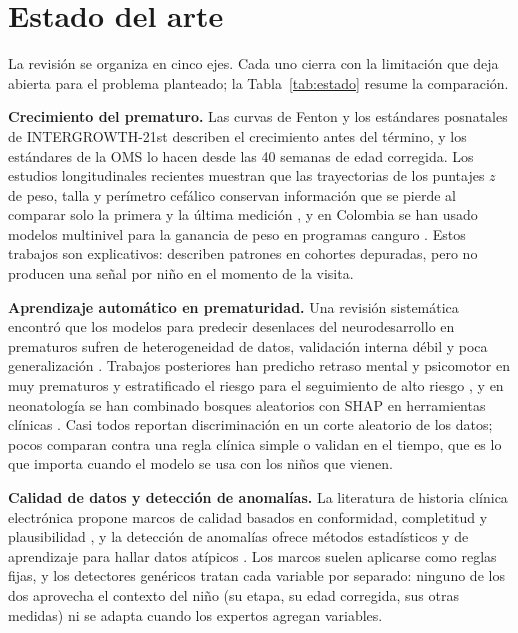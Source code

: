 \section{Estado del arte}
\label{sec:estado}

La revisión se organiza en cinco ejes. Cada uno cierra con la limitación que deja abierta para el problema planteado; la Tabla~\ref{tab:estado} resume la comparación.

\textbf{Crecimiento del prematuro.} Las curvas de Fenton \cite{fenton2013} y los estándares posnatales de INTERGROWTH-21st \cite{villar2015} describen el crecimiento antes del término, y los estándares de la OMS \cite{oms2006} lo hacen desde las 40 semanas de edad corregida. Los estudios longitudinales recientes muestran que las trayectorias de los puntajes $z$ de peso, talla y perímetro cefálico conservan información que se pierde al comparar solo la primera y la última medición \cite{ren2024,nel2026}, y en Colombia se han usado modelos multinivel para la ganancia de peso en programas canguro \cite{melo2016}. Estos trabajos son explicativos: describen patrones en cohortes depuradas, pero no producen una señal por niño en el momento de la visita.

\textbf{Aprendizaje automático en prematuridad.} Una revisión sistemática encontró que los modelos para predecir desenlaces del neurodesarrollo en prematuros sufren de heterogeneidad de datos, validación interna débil y poca generalización \cite{baker2023}. Trabajos posteriores han predicho retraso mental y psicomotor en muy prematuros \cite{demirci2024} y estratificado el riesgo para el seguimiento de alto riesgo \cite{mlrisk2024}, y en neonatología se han combinado bosques aleatorios con SHAP en herramientas clínicas \cite{wang2024}. Casi todos reportan discriminación en un corte aleatorio de los datos; pocos comparan contra una regla clínica simple o validan en el tiempo, que es lo que importa cuando el modelo se usa con los niños que vienen.

\textbf{Calidad de datos y detección de anomalías.} La literatura de historia clínica electrónica propone marcos de calidad basados en conformidad, completitud y plausibilidad \cite{kahn2016,weiskopf2013}, y la detección de anomalías ofrece métodos estadísticos y de aprendizaje para hallar datos atípicos \cite{chandola2009}. Los marcos suelen aplicarse como reglas fijas, y los detectores genéricos tratan cada variable por separado: ninguno de los dos aprovecha el contexto del niño (su etapa, su edad corregida, sus otras medidas) ni se adapta cuando los expertos agregan variables.

